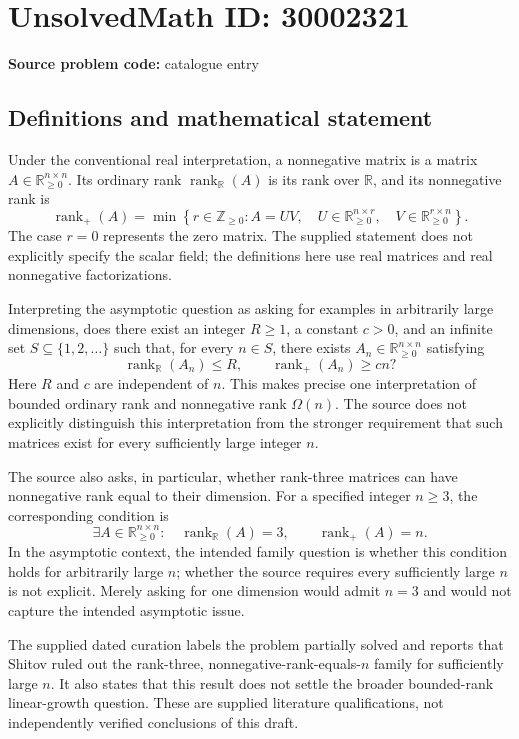 \documentclass[11pt]{article}
\newcommand{\Z}{\mathbb{Z}}
\newcommand{\R}{\mathbb{R}}
\begin{document}
\section*{UnsolvedMath ID: 30002321}
\textbf{Source problem code:} catalogue entry
\subsection{Definitions and mathematical statement}
Under the conventional real interpretation, a nonnegative matrix is a matrix \(A\in\R_{\geq 0}^{n\times n}\). Its ordinary rank \(\operatorname{rank}_{\R}(A)\) is its rank over \(\R\), and its nonnegative rank is
\[
\operatorname{rank}_{+}(A)=\min\left\{r\in\Z_{\geq 0}: A=UV,\quad U\in\R_{\geq 0}^{n\times r},\quad V\in\R_{\geq 0}^{r\times n}\right\}.
\]
The case \(r=0\) represents the zero matrix. The supplied statement does not explicitly specify the scalar field; the definitions here use real matrices and real nonnegative factorizations.

Interpreting the asymptotic question as asking for examples in arbitrarily large dimensions, does there exist an integer \(R\geq 1\), a constant \(c>0\), and an infinite set \(S\subseteq\{1,2,\ldots\}\) such that, for every \(n\in S\), there exists \(A_n\in\R_{\geq0}^{n\times n}\) satisfying
\[
\operatorname{rank}_{\R}(A_n)\leq R,
\qquad
\operatorname{rank}_{+}(A_n)\geq cn?
\]
Here \(R\) and \(c\) are independent of \(n\). This makes precise one interpretation of bounded ordinary rank and nonnegative rank \(\Omega(n)\). The source does not explicitly distinguish this interpretation from the stronger requirement that such matrices exist for every sufficiently large integer \(n\).

The source also asks, in particular, whether rank-three matrices can have nonnegative rank equal to their dimension. For a specified integer \(n\geq3\), the corresponding condition is
\[
\exists A\in\R_{\geq0}^{n\times n}:\quad
\operatorname{rank}_{\R}(A)=3,
\qquad
\operatorname{rank}_{+}(A)=n.
\]
In the asymptotic context, the intended family question is whether this condition holds for arbitrarily large \(n\); whether the source requires every sufficiently large \(n\) is not explicit. Merely asking for one dimension would admit \(n=3\) and would not capture the intended asymptotic issue.

The supplied dated curation labels the problem partially solved and reports that Shitov ruled out the rank-three, nonnegative-rank-equals-\(n\) family for sufficiently large \(n\). It also states that this result does not settle the broader bounded-rank linear-growth question. These are supplied literature qualifications, not independently verified conclusions of this draft.
\end{document}
